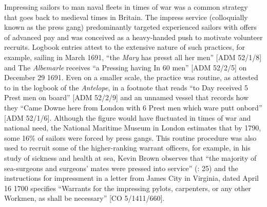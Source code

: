 Impressing sailors to man naval fleets in times of war was a common strategy that goes back to medieval times in Britain. The impress service (colloquially known as the press gang) predominantly targeted experienced sailors with offers of advanced pay and was conceived as a heavy-handed push to motivate volunteer recruits. Logbook entries attest to the extensive nature of such practices, for example, sailing in March 1691, “the \textit{Mary} has presst all her men” [ADM 52/1/8] and The \textit{Albemarle} receives “a Pressing having In 60 men” [ADM 52/2/5] on December 29 1691. Even on a smaller scale, the practice was routine, as attested to in the logbook of the \textit{Antelope}, in a footnote that reads “to Day received 5 Prest men on board” [ADM 52/2/9] and an unnamed vessel that records how they “Came Downe here from London with 6 Prest men which ware putt onbord” [ADM 52/1/6]. Although the figure would have fluctuated in times of war and national need, the National Maritime Museum in London estimates that by 1790, some 16\% of sailors were forced by press gangs. This routine procedure was also used to recruit some of the higher-ranking warrant officers, for example, in his study of sickness and health at sea, Kevin Brown observes that “the majority of sea-surgeons and surgeons’ mates were pressed into service” (\citeyear{Brown2011}: 25) and the instructions for impressment in a letter from James City in Virginia, dated April 16 1700 specifies “Warrants for the impressing pylots, carpenters, or any other Workmen, as shall be necessary” [CO 5/1411/660].

